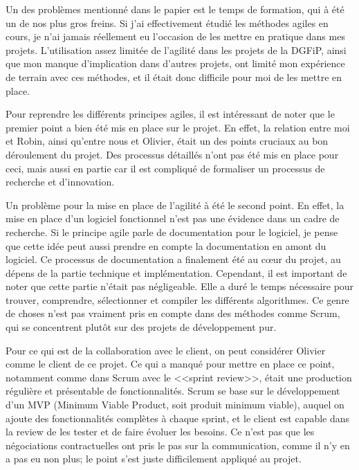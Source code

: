 \documentclass[openany, 11pt]{memoir}
\begin{document}
Un des problèmes mentionné dans le papier est le temps de formation, qui à été un de nos plus gros freins. Si j'ai effectivement étudié les méthodes agiles en cours, je n'ai jamais réellement eu l'occasion de les mettre en pratique dans mes projets. L'utilisation assez limitée de l'agilité dans les projets de la \gls{DGFiP}, ainsi que mon manque d'implication dans d'autres projets, ont limité mon expérience de terrain avec ces méthodes, et il était donc difficile pour moi de les mettre en place.

\bigskip
Pour reprendre les différents principes agiles, il est intéressant de noter que le premier point a bien été mis en place sur le projet. En effet, la relation entre moi et Robin, ainsi qu'entre nous et Olivier, était un des points cruciaux au bon déroulement du projet. Des processus détaillés n'ont pas été mis en place pour ceci, mais aussi en partie car il est compliqué de formaliser un processus de recherche et d'innovation.

Un problème pour la mise en place de l'agilité à été le second point. En effet, la mise en place d'un logiciel fonctionnel n'est pas une évidence dans un cadre de recherche. Si le principe agile parle de documentation pour le logiciel, je pense que cette idée peut aussi prendre en compte la documentation en amont du logiciel. Ce processus de documentation a finalement été au cœur du projet, au dépens de la partie technique et implémentation. Cependant, il est important de noter que cette partie n'était pas négligeable. Elle a duré le temps nécessaire pour trouver, comprendre, sélectionner et compiler les différents algorithmes. Ce genre de choses n'est pas vraiment pris en compte dans des méthodes comme Scrum, qui se concentrent plutôt sur des projets de développement pur.

Pour ce qui est de la collaboration avec le client, on peut considérer Olivier comme le client de ce projet. Ce qui a manqué pour mettre en place ce point, notamment comme dans Scrum avec le <<sprint review>>, était une production régulière et présentable de fonctionnalités. Scrum se base sur le développement d'un MVP (Minimum Viable Product, soit produit minimum viable), auquel on ajoute des fonctionnalités complètes à chaque sprint, et le client est capable dans la review de les tester et de faire évoluer les besoins. Ce n'est pas que les négociations contractuelles ont pris le pas sur la communication, comme il n'y en a pas eu non plus; le point s'est juste difficilement appliqué au projet.
\end{document}
